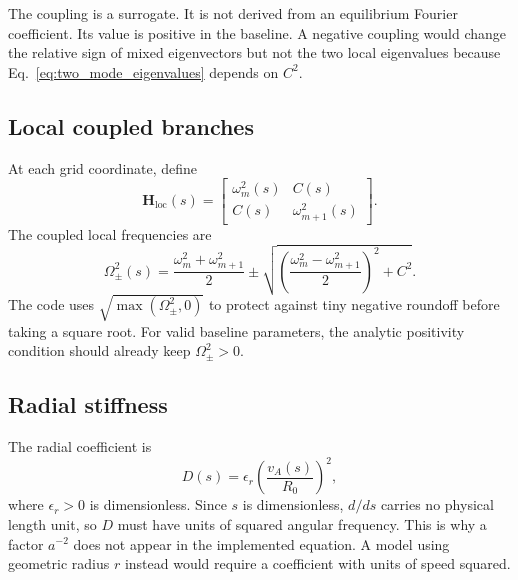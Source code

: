 The coupling is a surrogate. It is not derived from an equilibrium Fourier coefficient. Its value is positive in the baseline. A negative coupling would change the relative sign of mixed eigenvectors but not the two local eigenvalues because Eq.~\eqref{eq:two_mode_eigenvalues} depends on $C^2$.

\subsection{Local coupled branches}
At each grid coordinate, define
\begin{equation}
\mathbf H_{\mathrm{loc}}(s)=
\begin{bmatrix}
\omega_m^2(s)&C(s)\\
C(s)&\omega_{m+1}^2(s)
\end{bmatrix}.
\end{equation}
The coupled local frequencies are
\begin{equation}
\boxed{
\Omega_\pm^2(s)=
\frac{\omega_m^2+\omega_{m+1}^2}{2}
\pm
\sqrt{
\left(\frac{\omega_m^2-\omega_{m+1}^2}{2}\right)^2+C^2
}.}
\label{eq:benchmark_local_branches}
\end{equation}
The code uses $\sqrt{\max(\Omega_\pm^2,0)}$ to protect against tiny negative roundoff before taking a square root. For valid baseline parameters, the analytic positivity condition should already keep $\Omega_\pm^2>0$.

\subsection{Radial stiffness}
The radial coefficient is
\begin{equation}
\boxed{
D(s)=\epsilon_r\left(\frac{v_A(s)}{R_0}\right)^2,}
\label{eq:benchmark_D}
\end{equation}
where $\epsilon_r>0$ is dimensionless. Since $s$ is dimensionless, $d/ds$ carries no physical length unit, so $D$ must have units of squared angular frequency. This is why a factor $a^{-2}$ does not appear in the implemented equation. A model using geometric radius $r$ instead would require a coefficient with units of speed squared.

